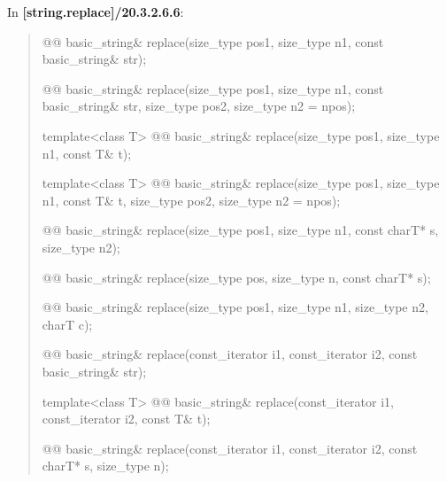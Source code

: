 \documentclass{wg21}
\begin{document}
In \textbf{[string.replace]/20.3.2.6.6}:
\begin{quote}
\begin{itemdecl}
@@ basic_string& replace(size_type pos1, size_type n1, const basic_string& str);
\end{itemdecl}

\begin{itemdecl}
@@ basic_string& replace(size_type pos1, size_type n1, const basic_string& str,
                                          size_type pos2, size_type n2 = npos);
\end{itemdecl}

\begin{itemdecl}
template<class T>
  @@ basic_string& replace(size_type pos1, size_type n1, const T& t);
\end{itemdecl}

\begin{itemdecl}
template<class T>
  @@ basic_string& replace(size_type pos1, size_type n1, const T& t,
                                            size_type pos2, size_type n2 = npos);
\end{itemdecl}

\begin{itemdecl}
@@ basic_string& replace(size_type pos1, size_type n1, const charT* s, size_type n2);
\end{itemdecl}

\begin{itemdecl}
@@ basic_string& replace(size_type pos, size_type n, const charT* s);
\end{itemdecl}

\begin{itemdecl}
@@ basic_string& replace(size_type pos1, size_type n1, size_type n2, charT c);
\end{itemdecl}

\begin{itemdecl}
@@
basic_string& replace(const_iterator i1, const_iterator i2, const basic_string& str);
\end{itemdecl}

\begin{itemdecl}
template<class T>
  @@
  basic_string& replace(const_iterator i1, const_iterator i2, const T& t);
\end{itemdecl}

\begin{itemdecl}
@@
basic_string& replace(const_iterator i1, const_iterator i2, const charT* s, size_type n);
\end{itemdecl}


\end{quote}
\end{document}
